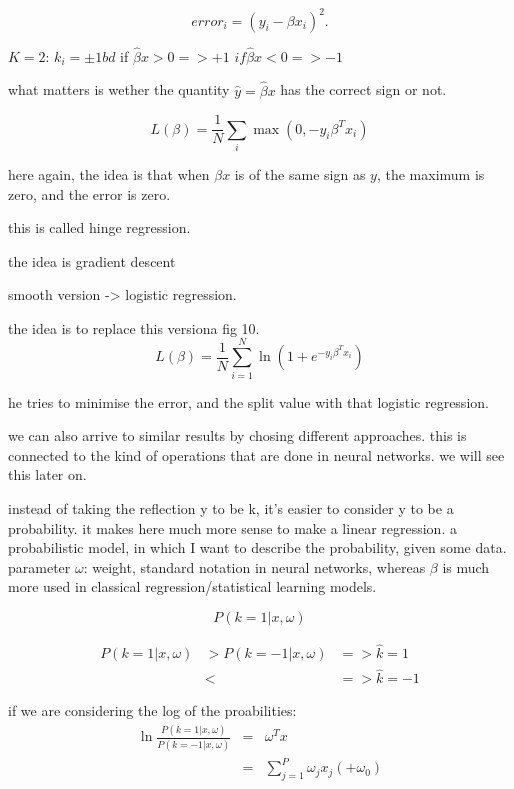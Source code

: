 \documentclass[a4paper]{tufte-book}
\newcommand{\nth}{\frac{1}{N}}
\newcommand{\sumin}{\sum_{i=1}^N}
\begin{document}
\begin{equation}
    error_i = (y_i - \beta x_i)^2.
\end{equation}

$K=2$: $k_i = \pm 1 bd$ if $\hat \beta x >0 => +1$
$if \hat \beta x<0 => -1$

what matters is wether the quantity $\hat y = \hat \beta x$ has the correct sign
or not.

\begin{equation}
    L(\beta) = \frac{1}{N} \sum_i \max(0, -y_i\beta^T x_i)
\end{equation}

here again, the idea is that when $\beta x$ is of the same sign as $y$, the maximum
is zero, and the error is zero.

this is called hinge regression.

the idea is gradient descent

smooth version -> logistic regression.

the idea is to replace this versiona
fig 10.
\begin{equation}
    L(\beta) = \nth \sumin \ln (1+e^{-y_i \beta^T x_i} )
\end{equation}

he tries to minimise the error, and the split value with  that logistic regression.

we can also arrive to similar results by chosing different approaches.
this is connected to the kind of operations that are done in neural networks.
we will see this later on.

instead of taking the reflection y to be k, it's easier to consider y to be
a probability. it makes here much more sense to make a linear regression.
a probabilistic model, in which I want to describe the probability, given some data.
parameter $\omega$: weight, standard notation in neural networks, whereas $\beta$ is
much more used in classical regression/statistical learning models.

\begin{equation}
    P(k=1 | x,\omega)
\end{equation}

\begin{eqnarray}
    P(k=1|x,\omega ) & >  P(k=-1|x,\omega) & => \hat k = 1 \\
    & <      &  => \hat k = -1
\end{eqnarray}


if we are considering the log of the proabilities:
\begin{eqnarray}
    \ln \frac{P(k=1|x,\omega)}{P(k=-1|x,\omega)} & = & \omega^T x\\
    & = &  \sum_{j=1}^P \omega_j x_j (+\omega_0)
\end{eqnarray}
\end{document}
